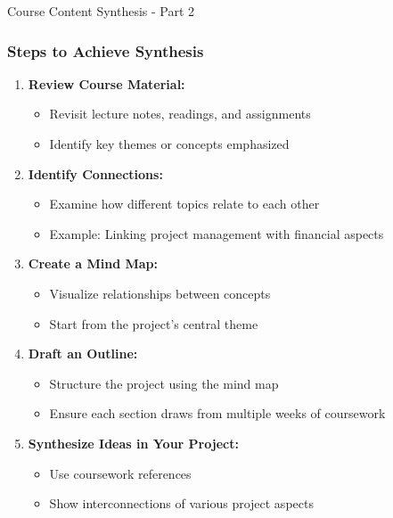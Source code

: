\documentclass[aspectratio=169]{beamer}
\begin{document}
\begin{frame}[fragile]{Course Content Synthesis - Part 2}
  \frametitle{Steps to Achieve Synthesis}
  \begin{enumerate}
    \item \textbf{Review Course Material:}
      \begin{itemize}
        \item Revisit lecture notes, readings, and assignments
        \item Identify key themes or concepts emphasized
      \end{itemize}
    \item \textbf{Identify Connections:}
      \begin{itemize}
        \item Examine how different topics relate to each other
        \item Example: Linking project management with financial aspects
      \end{itemize}
    \item \textbf{Create a Mind Map:}
      \begin{itemize}
        \item Visualize relationships between concepts
        \item Start from the project's central theme
      \end{itemize}
    \item \textbf{Draft an Outline:}
      \begin{itemize}
        \item Structure the project using the mind map
        \item Ensure each section draws from multiple weeks of coursework
      \end{itemize}
    \item \textbf{Synthesize Ideas in Your Project:}
      \begin{itemize}
        \item Use coursework references
        \item Show interconnections of various project aspects
      \end{itemize}
  \end{enumerate}
\end{frame}
\end{document}
